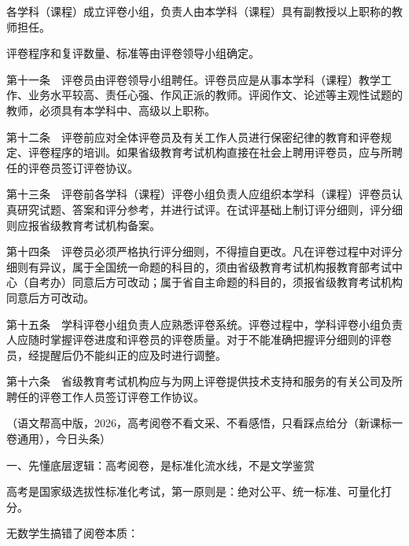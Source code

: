 \documentclass[12pt,a4paper]{article}
\begin{document}
各学科（课程）成立评卷小组，负责人由本学科（课程）具有副教授以上职称的教师担任。



评卷程序和复评数量、标准等由评卷领导小组确定。



第十一条　评卷员由评卷领导小组聘任。评卷员应是从事本学科（课程）教学工作、业务水平较高、责任心强、作风正派的教师。评阅作文、论述等主观性试题的教师，必须具有本学科中、高级以上职称。



第十二条　评卷前应对全体评卷员及有关工作人员进行保密纪律的教育和评卷规定、评卷程序的培训。如果省级教育考试机构直接在社会上聘用评卷员，应与所聘任的评卷员签订评卷协议。



第十三条　评卷前各学科（课程）评卷小组负责人应组织本学科（课程）评卷员认真研究试题、答案和评分参考，并进行试评。在试评基础上制订评分细则，评分细则应报省级教育考试机构备案。



第十四条　评卷员必须严格执行评分细则，不得擅自更改。凡在评卷过程中对评分细则有异议，属于全国统一命题的科目的，须由省级教育考试机构报教育部考试中心（自考办）同意后方可改动；属于省自主命题的科目的，须报省级教育考试机构同意后方可改动。



第十五条　学科评卷小组负责人应熟悉评卷系统。评卷过程中，学科评卷小组负责人应随时掌握评卷进度和评卷员的评卷质量。对于不能准确把握评分细则的评卷员，经提醒后仍不能纠正的应及时进行调整。



第十六条　省级教育考试机构应与为网上评卷提供技术支持和服务的有关公司及所聘任的评卷工作人员签订评卷工作协议。









{\color{gray}\small （语文帮高中版，2026，高考阅卷不看文采、不看感悟，只看踩点给分（新课标一卷通用）}，今日头条）



一、先懂底层逻辑：高考阅卷，是标准化流水线，不是文学鉴赏





高考是国家级选拔性标准化考试，第一原则是：绝对公平、统一标准、可量化打分。





无数学生搞错了阅卷本质：
\end{document}
